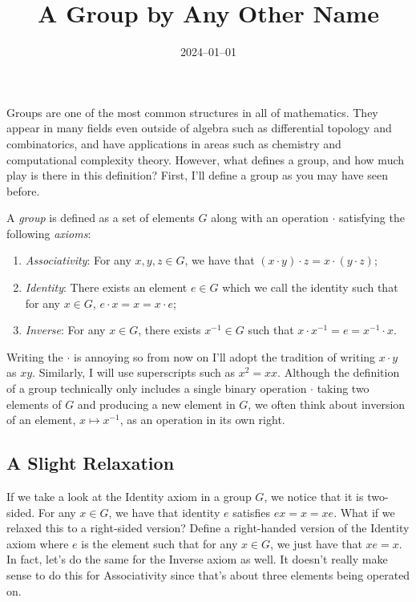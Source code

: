 \documentclass{article}
\title{A Group by Any \newline Other Name}
\date{2024--01--01}
\begin{document}
\maketitle

Groups are one of the most common structures in all of mathematics.
They appear in many fields even outside of algebra such as differential topology and combinatorics, and have applications in areas such as chemistry and computational complexity theory.
However, what defines a group, and how much play is there in this definition?
First, I'll define a group as you may have seen before.

\begin{defn}\label{defn:grp}
  A \emph{group} is defined as a set of elements $G$ along with an operation $\cdot$ satisfying the following \emph{axioms}:
  \begin{enumerate}
  \item \emph{Associativity}: For any $x, y, z \in G$, we have that $(x \cdot y) \cdot z = x \cdot (y \cdot z)$;
  \item \emph{Identity}: There exists an element $e \in G$ which we call the identity such that for any $x \in G$, $e \cdot x = x = x \cdot e$;
  \item \emph{Inverse}: For any $x \in G$, there exists $x^{-1} \in G$ such that $x \cdot x^{-1} = e = x^{-1} \cdot x$.
  \end{enumerate}
\end{defn}

Writing the $\cdot$ is annoying so from now on I'll adopt the tradition of writing $x \cdot y$ as $xy$.
Similarly, I will use superscripts such as $x^{2} = xx$.
Although the definition of a group technically only includes a single binary operation $\cdot$ taking two elements of $G$ and producing a new element in $G$, we often think about inversion of an element, $x \mapsto x^{-1}$, as an operation in its own right.

\subsection*{A Slight Relaxation}

If we take a look at the Identity axiom in a group $G$, we notice that it is two-sided.
For any $x \in G$, we have that identity $e$ satisfies $ex = x = xe$.
What if we relaxed this to a right-sided version?
Define a right-handed version of the Identity axiom where $e$ is the element such that for any $x \in G$, we just have that $xe = x$.
In fact, let's do the same for the Inverse axiom as well.
It doesn't really make sense to do this for Associativity since that's about three elements being operated on.
\end{document}
